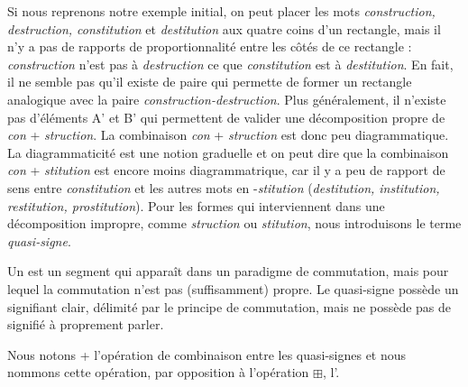 Si nous reprenons notre exemple initial, on peut placer les mots \textit{construction,} \textit{destruction, constitution} et \textit{destitution} aux quatre coins d’un rectangle, mais il n’y a pas de rapports de proportionnalité entre les côtés de ce rectangle : \textit{construction} n’est pas à \textit{destruction} ce que \textit{constitution} est à \textit{destitution}. En fait, il ne semble pas qu’il existe de paire qui permette de former un rectangle analogique avec la paire \textit{construction-destruction}. Plus généralement, il n’existe pas d’éléments A’ et B’ qui permettent de valider une décomposition propre de \textit{con} + \textit{struction}. La combinaison \textit{con} + \textit{struction} est donc peu diagrammatique. La diagrammaticité est une notion graduelle et on peut dire que la combinaison \textit{con} + \textit{stitution} est encore moins diagrammatrique, car il y a peu de rapport de sens entre \textit{constitution} et les autres mots en -\textit{stitution} (\textit{destitution, institution, restitution, prostitution}). Pour les formes qui interviennent dans une décomposition impropre, comme \textit{struction} ou \textit{stitution}, nous introduisons le terme \textit{quasi-signe}.

\begin{styleLivreImportant}
Un  est un segment qui apparaît dans un paradigme de commutation, mais pour lequel la commutation n’est pas (suffisamment) propre. Le quasi-signe possède un signifiant clair, délimité par le principe de commutation, mais ne possède pas de signifié à proprement parler.
\end{styleLivreImportant}

\begin{styleLivreImportant}
Nous notons + l’opération de combinaison entre les quasi-signes et nous nommons cette opération, par opposition à l’opération ${\boxplus}$, l’.
\end{styleLivreImportant}


